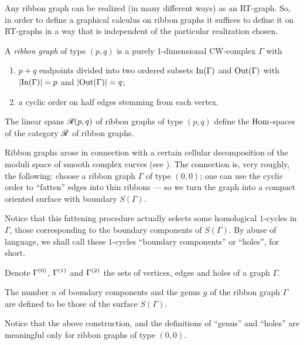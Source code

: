 Any ribbon graph can be realized (in many different ways) as an
RT-graph. So, in order to define a graphical calculus on ribbon graphs
it suffices to define it on RT-graphs in a way that is independent of
the particular realization chosen.

\begin{definition}\label{dfn:ribbon-graphs}
  A \emph{ribbon graph} of type $(p,q)$ is a purely 1-dimensional
  CW-complex $\Gamma$ with 
  \begin{enumerate}
  \item $p+q$ endpoints divided into two ordered subsets $\operatorname{In}(\Gamma)$ and
    $\operatorname{Out}(\Gamma)$ with $\lvert\operatorname{In}(\Gamma)\rvert=p$ and $\lvert\operatorname{Out}(\Gamma)\rvert=q$;
  \item a cyclic order on half edges stemming from each vertex.
  \end{enumerate}
  The linear spans $\mathscr{R}_{}(p,q)$ of ribbon graphs of type $(p,q)$ define the
  $\operatorname{Hom}$-spaces of the category $\mathscr{R}_{}$ of ribbon graphs.
\end{definition}

Ribbon graphs arose in connection with a certain cellular
decomposition of the moduli space of smooth complex curves (see
). The connection is, very roughly, the following:
choose a ribbon graph $\Gamma$ of type $(0,0)$; one can use the cyclic
order to ``fatten'' edges into thin ribbons --- so we turn the graph
into a compact oriented surface with boundary $S(\Gamma)$.

Notice that this fattening procedure actually selects some homological
$1$-cycles in $\Gamma$, those corresponding to the boundary components
of $S(\Gamma)$. By abuse of language, we shall call these $1$-cycles
``boundary components'' or ``holes'', for short.

Denote $\Gamma^{(0)}$, $\Gamma^{(1)}$ and $\Gamma^{(2)}$ the
sets of vertices, edges and holes of a graph $\Gamma$.

The number $n$ of boundary components and the genus $g$ of the ribbon
graph $\Gamma$ are defined to be those of the surface $S(\Gamma)$.
\begin{remark}
  Notice that the above construction, and the definitions of ``genus''
  and ``holes'' are meaningful only for ribbon graphs of type $(0,0)$.
\end{remark}

